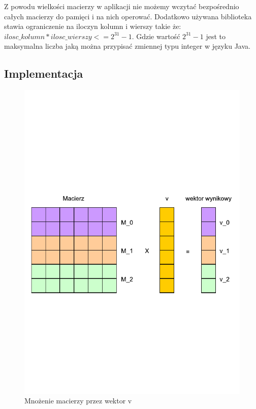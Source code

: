 \documentclass[11pt,a4paper]{report}
\begin{document}
Z powodu wielkości macierzy w aplikacji nie możemy wczytać bezpośrednio całych macierzy do pamięci i na nich operować. Dodatkowo używana biblioteka stawia ograniczenie na iloczyn kolumn i wierszy takie że: $ilosc\_kolumn * ilosc\_wierszy <= 2^{31}-1$.  Gdzie wartość $2^{31}-1$ jest to maksymalna liczba jaką można przypisać zmiennej typu integer w języku Java. 



\subsection*{Implementacja}

\begin{figure}[htb]
\centering
\includegraphics[width=1\textwidth, trim = 0mm 45mm 0mm 50mm, clip]{matrix_multiply.pdf}
\caption{Mnożenie macierzy przez wektor v}
\label{fig:matrix_mult_fig}
\end{figure}
\end{document}
